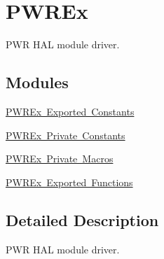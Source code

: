 \hypertarget{group___p_w_r_ex}{}\section{P\+W\+R\+Ex}
\label{group___p_w_r_ex}


P\+WR H\+AL module driver.  


\subsection*{Modules}
\begin{DoxyCompactItemize}
\item 
\mbox{\hyperlink{group___p_w_r_ex___exported___constants}{P\+W\+R\+Ex Exported Constants}}
\item 
\mbox{\hyperlink{group___p_w_r_ex___private___constants}{P\+W\+R\+Ex Private Constants}}
\item 
\mbox{\hyperlink{group___p_w_r_ex___private___macros}{P\+W\+R\+Ex Private Macros}}
\item 
\mbox{\hyperlink{group___p_w_r_ex___exported___functions}{P\+W\+R\+Ex Exported Functions}}
\end{DoxyCompactItemize}


\subsection{Detailed Description}
P\+WR H\+AL module driver. 

